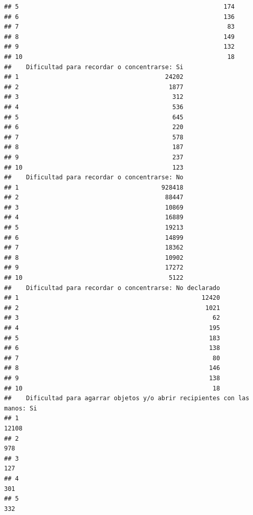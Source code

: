 \documentclass[11pt,]{article}
\begin{document}
\begin{verbatim}
## 5                                                        174
## 6                                                        136
## 7                                                         83
## 8                                                        149
## 9                                                        132
## 10                                                        18
##    Dificultad para recordar o concentrarse: Si
## 1                                        24202
## 2                                         1877
## 3                                          312
## 4                                          536
## 5                                          645
## 6                                          220
## 7                                          578
## 8                                          187
## 9                                          237
## 10                                         123
##    Dificultad para recordar o concentrarse: No
## 1                                       928418
## 2                                        88447
## 3                                        10869
## 4                                        16889
## 5                                        19213
## 6                                        14899
## 7                                        18362
## 8                                        10902
## 9                                        17272
## 10                                        5122
##    Dificultad para recordar o concentrarse: No declarado
## 1                                                  12420
## 2                                                   1021
## 3                                                     62
## 4                                                    195
## 5                                                    183
## 6                                                    138
## 7                                                     80
## 8                                                    146
## 9                                                    138
## 10                                                    18
##    Dificultad para agarrar objetos y/o abrir recipientes con las manos: Si
## 1                                                                    12108
## 2                                                                      978
## 3                                                                      127
## 4                                                                      301
## 5                                                                      332

\end{verbatim}
\end{document}
